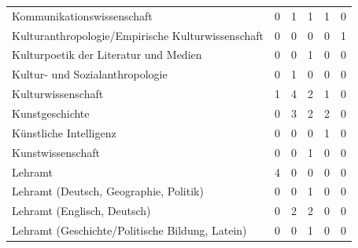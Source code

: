 \documentclass{scrartcl}
\begin{document}
\begin{landscape}
\begin{longtable}{L{7.5cm}ccccc}
Kommunikationswissenschaft                           & 0                     &  1                       &  1                       & 1                    & 0                       \\
Kulturanthropologie/Empirische Kulturwissenschaft    & 0                     &  0                       &  0                       & 0                    & 1                       \\
Kulturpoetik der Literatur und Medien                & 0                     &  0                       &  1                       & 0                    & 0                       \\
Kultur- und Sozialanthropologie                      & 0                     &  1                       &  0                       & 0                    & 0                       \\
Kulturwissenschaft                                   & 1                     &  4                       &  2                       & 1                    & 0                       \\
Kunstgeschichte                                      & 0                     &  3                       &  2                       & 2                    & 0                       \\
Künstliche Intelligenz                               & 0                     &  0                       &  0                       & 1                    & 0                       \\
Kunstwissenschaft                                    & 0                     &  0                       &  1                       & 0                    & 0                       \\
Lehramt                                              & 4                     &  0                       &  0                       & 0                    & 0                       \\
Lehramt (Deutsch, Geographie, Politik)               & 0                     &  0                       &  1                       & 0                    & 0                       \\
Lehramt (Englisch, Deutsch)                          & 0                     &  2                       &  2                       & 0                    & 0                       \\
Lehramt (Geschichte/Politische Bildung, Latein)      & 0                     &  0                       &  1                       & 0                    & 0                       \\

\end{longtable}
\end{landscape}
\end{document}
